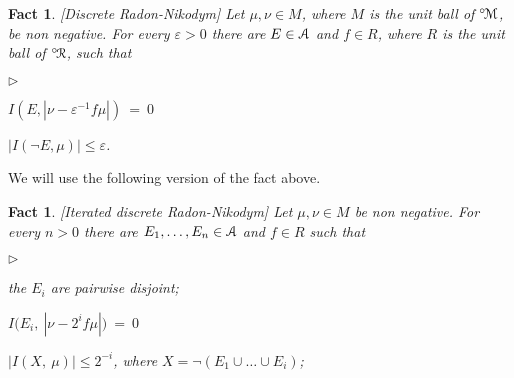 \documentclass[12pt,letterpaper,oneside,reqno]{amsart}
\newcommand{\mylabel}[1]{{#1}\hfill}
\renewenvironment{itemize}
  {\begin{list}{$\triangleright$}{%
   \setlength{\parskip}{0mm}
   \setlength{\topsep}{.2\baselineskip}
   \setlength{\rightmargin}{0mm}
   \setlength{\listparindent}{0mm}
   \setlength{\itemindent}{0mm}
   \setlength{\labelwidth}{3ex}
   \setlength{\itemsep}{.2\baselineskip}
   \setlength{\parsep}{.2\baselineskip}
   \setlength{\partopsep}{0mm}
   \setlength{\labelsep}{1ex}
   \setlength{\leftmargin}{\labelwidth+\labelsep}
   \let\makelabel\mylabel}}{%
   \end{list}}
\theoremstyle{plain}
\newtheorem{fact}[theorem]{Fact}
\theoremstyle{remark}
\begin{document}
\begin{fact}\label{thm_fRN}
  [Discrete Radon-Nikodym]
  Let $\mu,\nu\in M$, where $M$ is the unit ball of ${}^{\circ\!}{\EuScript M}$, be non negative.
  For every $\varepsilon > 0$ there are $E\in{\EuScript A}$ and $f\in R$, where $R$ is the unit ball of ${}^{\circ\!}{\EuScript R}$, such that
  \begin{itemize}
    \item[1.] $I(E,|\nu-\varepsilon^{-1}f\mu|)\ =\ 0$
    \item[2.] $|I(\neg E, \mu)|\le\varepsilon$.
  \end{itemize}
\end{fact}

We will use the following version of the fact above.




\begin{fact}\label{thm_fRN2}
  [Iterated discrete Radon-Nikodym]
  Let $\mu,\nu\in M$ be non negative.
  For every $n>0$ there are $E_1,\dots,E_n\in{\EuScript A}$ and $f\in R$ such that
  \begin{itemize}
    \item[0.] the $E_i$ are pairwise disjoint;
    \item[1.] $I\big(E_i,\ |\nu-2^if\mu|\big)\ =\ 0$
    \item[2.] $|I(X,\ \mu)|\le2^{-i}$, where $X=\neg(E_1\cup\dots\cup E_i)$;
  \end{itemize}
\end{fact}
\end{document}
